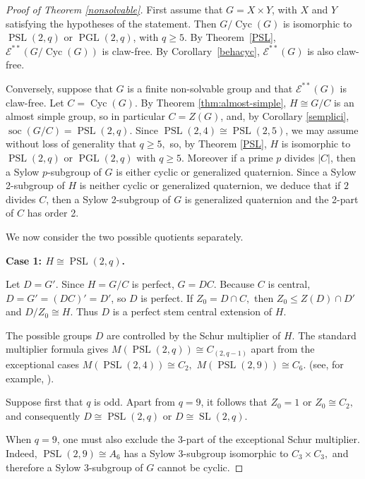 \documentclass[preprint,11pt]{elsarticle}
\newcommand{\cyc}{\operatorname{Cyc}}
\newcommand{\PSL}{\operatorname{PSL}}
\newcommand{\PGL}{\operatorname{PGL}}
\newcommand{\soc}{\operatorname{soc}}
\begin{document}
\begin{proof}[Proof of Theorem \ref{nonsolvable}]
	
First assume that $G=X \times Y$, with $X$ and $Y$ satisfying the hypotheses of the statement. Then $G/\cyc(G)$ is isomorphic to $\PSL(2,q)$ or $\PGL(2,q)$, with $q\geq 5$. By Theorem~\ref{PSL}, $\mathcal{E}^{**}(G/\cyc(G))$ is claw-free. By Corollary~\ref{behacyc}, $\mathcal{E}^{**}(G)$ is also claw-free.

Conversely,	suppose that
	$G$ is a finite non-solvable group and that $\mathcal E^{**}(G)$ is claw-free. Let $C=\cyc(G).$ By Theorem \ref{thm:almost-simple}, $H\cong G/C$ is an almost simple group, so in particular $C=Z(G)$, and, by Corollary \ref{semplici}, $\soc(G/C)=\PSL(2,q).$ Since $\PSL(2,4)\cong \PSL(2,5)$, we may assume without loss of generality
	that $q\geq 5,$ so, by Theorem \ref{PSL}, $H$ is isomorphic to $\PSL(2,q)$ or $\PGL(2,q)$ with $q\geq 5.$ Moreover if a prime $p$ divides $|C|$, then a Sylow $p$-subgroup of $G$ is either cyclic or generalized quaternion. Since a Sylow 2-subgroup of $H$ is neither cyclic or generalized quaternion, we deduce that if $2$ divides $C$, then a Sylow 2-subgroup of $G$ is generalized quaternion and the 2-part of $C$ has order 2.
	

	We now consider the two possible quotients separately.
	
	\medskip
	\noindent
	\textbf{Case 1: $H\cong\operatorname{PSL}(2,q)$.}
	


Let
$
	D=G'.
$
Since $H=G/C$ is perfect,
	$G=DC.
$
	Because $C$ is central,
$
	D=G'=(DC)'=D'$,
	so $D$ is perfect.  If
$
	Z_0=D\cap C,
$
	then
$
Z_0\leq Z(D)\cap D'
$
and
$
D/Z_0\cong H.
$
	Thus $D$ is a perfect stem central extension of $H$.
	
	The possible groups $D$ are controlled by the Schur multiplier
	of $H$.  The standard multiplier formula gives
	$
	M(\operatorname{PSL}(2,q))
	\cong C_{(2,q-1)}
	$
	apart from the exceptional cases
	$
	M(\operatorname{PSL}(2,4))\cong C_2,$
$M(\operatorname{PSL}(2,9))\cong C_6.
$ (see, for example, 
	\cite[Kapitel V, Satz 25.7]{Endliche-gruppen-I-Huppert}).
	
	Suppose first that $q$ is odd.  Apart from $q=9$, it follows
	that
$
	Z_0=1
$ or $
	Z_0\cong C_2,
$
	and consequently
$
	D\cong\operatorname{PSL}(2,q)$ or
$	D\cong\operatorname{SL}(2,q).
$
	
	When $q=9$, one must also exclude the $3$-part of the exceptional
	Schur multiplier.  Indeed,
$
	\operatorname{PSL}(2,9)\cong A_6
$
	has a Sylow $3$-subgroup isomorphic to
$
	C_3\times C_3, 
$ and therefore a Sylow 3-subgroup of $G$ cannot be cyclic.


\end{proof}
\end{document}
